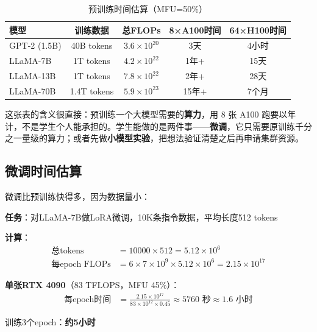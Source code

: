 \begin{table}[htbp]
\centering
\small
\renewcommand{\arraystretch}{1.4}
\begin{tabular}{l|c|c|c|c}
\toprule
\textbf{模型} & \textbf{训练数据} & \textbf{总FLOPs} & \textbf{8×A100时间} & \textbf{64×H100时间} \\
\midrule
GPT-2 (1.5B) & 40B tokens & $3.6 \times 10^{20}$ & 3天 & 4小时 \\
LLaMA-7B & 1T tokens & $4.2 \times 10^{22}$ & 1年+ & 15天 \\
LLaMA-13B & 1T tokens & $7.8 \times 10^{22}$ & 2年+ & 28天 \\
LLaMA-70B & 1.4T tokens & $5.9 \times 10^{23}$ & 15年+ & 7个月 \\
\bottomrule
\end{tabular}
\caption{预训练时间估算（MFU=50\%）}
\end{table}

\begin{remark}
这张表的含义很直接：预训练一个大模型需要的\textbf{算力}，用 8 张 A100 跑要以年计，不是学生个人能承担的。学生能做的是两件事——\textbf{微调}，它只需要原训练千分之一量级的算力；或者先做\textbf{小模型实验}，把想法验证清楚之后再申请集群资源。
\end{remark}

\subsection*{微调时间估算}

微调比预训练快得多，因为数据量小：

\begin{example}[LoRA微调时间估算]
\textbf{任务}：对LLaMA-7B做LoRA微调，10K条指令数据，平均长度512 tokens

\textbf{计算}：
\begin{align}
    \text{总tokens} &= 10000 \times 512 = 5.12 \times 10^6 \\
    \text{每epoch FLOPs} &= 6 \times 7 \times 10^9 \times 5.12 \times 10^6 = 2.15 \times 10^{17}
\end{align}

\textbf{单张RTX 4090}（83 TFLOPS，MFU 45\%）：
\begin{align}
    \text{每epoch时间} &= \frac{2.15 \times 10^{17}}{83 \times 10^{12} \times 0.45} \approx 5760 \text{ 秒} \approx 1.6 \text{ 小时}
\end{align}

训练3个epoch：\textbf{约5小时}
\end{example}

